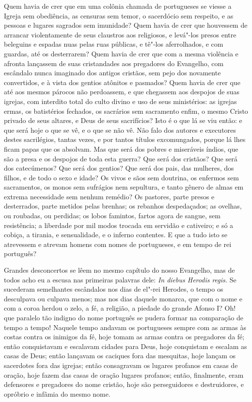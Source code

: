 Quem havia de crer que em uma colônia chamada de portugueses se viesse a
Igreja sem obediência, as censuras sem temor, o sacerdócio sem respeito,
e as pessoas e lugares sagrados sem imunidade? Quem havia de crer que
houvessem de arrancar violentamente de seus claustros aos religiosos, e
levá"-los presos entre beleguins e espadas nuas pelas ruas públicas, e
tê"-los aferrolhados, e com guardas, até os desterrarem? Quem havia de
crer que com a mesma violência e afronta lançassem de suas cristandades
aos pregadores do Evangelho, com escândalo nunca imaginado dos antigos
cristãos, sem pejo dos novamente convertidos, e à vista dos gentios
atônitos e pasmados? Quem havia de crer que até aos mesmos párocos não
perdoassem, e que
chegassem aos despojos de suas igrejas, com interdito total do culto
divino e uso de seus ministérios: as igrejas ermas, os batistérios
fechados, os sacrários sem sacramento enfim, o mesmo Cristo privado de
seus altares, e Deus de seus sacrifícios? Isto é o que lá se viu então:
e que será hoje o que se vê, e o que se não vê. Não falo dos autores e
executores destes sacrilégios, tantas vezes, e por tantos títulos
excomungados, porque lá lhes ficam papas que os absolvam. Mas que será
dos pobres e miseráveis índios, que são a presa e os despojos de toda
esta guerra? Que será dos cristãos? Que será dos catecúmenos? Que será
dos gentios? Que será dos pais, das mulheres, dos filhos, e de todo o
sexo e idade? Os vivos e sãos sem doutrina, os enfermos sem sacramentos,
os monos sem sufrágios nem sepultura, e tanto gênero de almas em extrema
necessidade sem nenhum remédio? Os pastores, parte presos e desterrados,
parte metidos pelas brenhas; os rebanhos despedaçados; as ovelhas, ou
roubadas, ou perdidas; os lobos famintos, fartos agora de sangue, sem
resistência; a liberdade por mil modos trocada em servidão e cativeiro;
e só a cobiça, a tirania, e sensualidade, e o inferno contentes. E que a
tudo isto se atrevessem e atrevam homens com nomes de portugueses, e em
tempo de rei português?

Grandes desconcertos se lêem no mesmo capítulo do nosso Evangelho, mas
de todos acho eu a escusa nas primeiras palavras dele: \emph{In diebus
Herodis regis.} Se sucederam semelhantes escândalos nos dias de el"-rei
Herodes, o tempo os desculpava ou culpava menos; mas nos dias daquele
monarca, que com o nome e com a coroa herdou o zelo, a fé, a religião, a
piedade do grande Afonso I? Oh! que paralelo tão indigno do nome
português se pudera formar na comparação de tempo a tempo! Naquele tempo
andavam os portugueses sempre com as armas às costas contra os inimigos
da fé, hoje tomam as armas contra os pregadores da fé; então
conquistavam e escalavam cidades para Deus, hoje conquistam e escalam as
casas de Deus; então lançavam os caciques fora das mesquitas, hoje
lançam os sacerdotes fora das igrejas; então consagravam os lugares
profanos em casas de oração, hoje fazem das casas de oração lugares
profanos; então, finalmente, eram defensores e pregadores do nome
cristão, hoje são perseguidores e destruidores, e opróbrio e infâmia do
mesmo nome.

